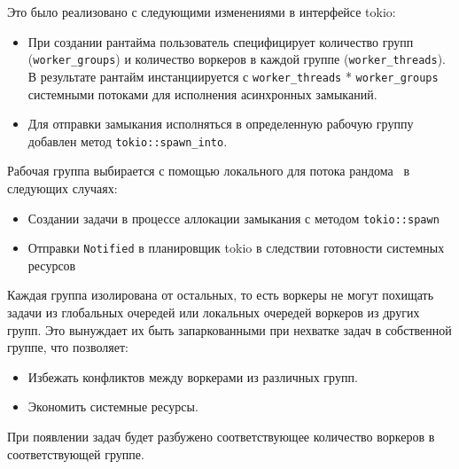 Это было реализовано с следующими изменениями в интерфейсе tokio:

\begin{itemize}

\item При создании рантайма пользователь специфицирует количество групп (\verb|worker_groups|) и количество воркеров в каждой группе (\verb|worker_threads|). В результате рантайм инстанциируется с \verb|worker_threads| * \verb|worker_groups| системными потоками для исполнения асинхронных замыканий.
\item Для отправки замыкания исполняться в определенную рабочую группу добавлен метод \verb|tokio::spawn_into|.
\end{itemize}


Рабочая группа выбирается с помощью локального для потока рандома~\cite{xorshiftRNG} в следующих случаях:

\begin{itemize}
    \item Создании задачи в процессе аллокации замыкания с методом \verb|tokio::spawn|
    \item Отправки \verb|Notified| в планировщик tokio в следствии готовности системных ресурсов
\end{itemize}

Каждая группа изолирована от остальных, то есть воркеры не могут похищать задачи из глобальных очередей или локальных очередей воркеров из других групп. Это вынуждает их быть запаркованными при нехватке задач в собственной группе, что позволяет:

\begin{itemize}
    \item Избежать конфликтов между воркерами из различных групп.
    \item Экономить системные ресурсы.
\end{itemize}

При появлении задач будет разбужено соответствующее количество воркеров в соответствующей группе.
